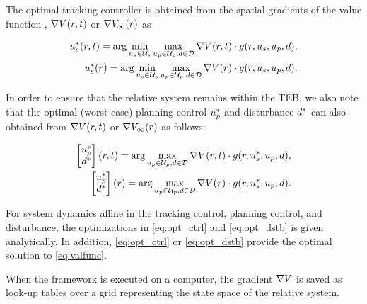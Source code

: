 The optimal tracking controller is obtained from the spatial gradients of the value function \cite{Mitchell05, Fisac15, Chen2018}, $\nabla V(r, t)$ or $\nabla V_\infty(r)$ as

\begin{subequations} \label{eq:opt_ctrl}
  \begin{align}
  \tctrl^*(\rstate, \tvar) = \arg\min_{\tctrl\in\tcset} \max_{\pctrl\in\pcset, \dstb\in\dset} \nabla\valfunc(\rstate, \tvar) \cdot \rdyn(\rstate,\tctrl,\pctrl,\dstb), \label{eq:opt_ctrl_fin}\\
  \tctrl^*(\rstate) = \arg\min_{\tctrl\in\tcset} \max_{\pctrl\in\pcset, \dstb\in\dset} \nabla\valfunc(\rstate) \cdot \rdyn(\rstate,\tctrl,\pctrl,\dstb). \label{eq:opt_ctrl_inf}
  \end{align}
\end{subequations}

In order to ensure that the relative system remains within the TEB, we also note that the optimal (worst-case) planning control $u_p^*$ and disturbance $d^*$ can also obtained from $\nabla V(r, t)$ or $\nabla V_\infty(r)$ as follows:

\begin{subequations} \label{eq:opt_dstb}
  \begin{align}
  \begin{bmatrix}
    u_p^* \\
    d^*
  \end{bmatrix} (r, t) = \arg \max_{u_p\in\mathcal{U}_p, d\in\mathcal{D}} \nabla V(r, t) \cdot g(r,u_s^*,u_p,d), \\
  \begin{bmatrix}
    u_p^* \\
    d^*
  \end{bmatrix}(r) = \arg \max_{u_p\in\mathcal{U}_p, d\in\mathcal{D}} \nabla V(r) \cdot g(r,u_s^*,u_p,d). 
  \end{align}
\end{subequations}

For system dynamics affine in the tracking control, planning control, and disturbance, the optimizations in \eqref{eq:opt_ctrl} and \eqref{eq:opt_dstb} is given analytically.
In addition, \eqref{eq:opt_ctrl} or \eqref{eq:opt_dstb} provide the optimal solution to \eqref{eq:valfunc}.

When the framework is executed on a computer, the gradient $\nabla V$ is saved as look-up tables over a grid representing the state space of the relative system.

